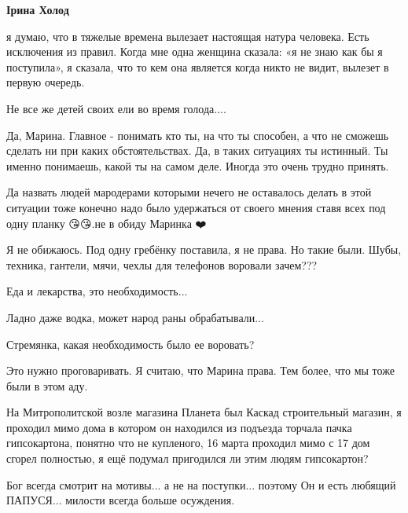 \textbf{Ірина Холод} 

я думаю, что в тяжелые времена вылезает настоящая натура человека. Есть
исключения из правил. Когда мне одна женщина сказала: «я не знаю как бы я
поступила», я сказала, что то кем она является когда никто не видит, вылезет в
первую очередь.

Не все же детей своих ели во время голода....

\begin{itemize} %

Да, Марина. Главное - понимать кто ты, на что ты способен, а что не сможешь
сделать ни при каких обстоятельствах. Да, в таких ситуациях ты истинный. Ты
именно понимаешь, какой ты на самом деле. Иногда это очень трудно принять.

\end{itemize} %


Да назвать людей мародерами которыми нечего не оставалось делать в этой
ситуации тоже конечно надо было удержаться от своего мнения ставя всех под одну
планку 😘😘.не в обиду Маринка ❤️


Я не обижаюсь. Под одну гребёнку поставила, я не права. Но такие были. Шубы,
техника, гантели, мячи, чехлы для телефонов воровали зачем???

Еда и лекарства, это необходимость...

Ладно даже водка, может народ раны обрабатывали...

Стремянка, какая необходимость было ее воровать?

\begin{itemize} %

Это нужно проговаривать. Я считаю, что Марина права. Тем более, что мы тоже
были в этом аду.

\end{itemize} %


На Митрополитской возле магазина Планета был Каскад строительный магазин, я
проходил мимо дома в котором он находился из подъезда торчала пачка
гипсокартона, понятно что не купленого, 16 марта проходил мимо с 17 дом сгорел
полностью, я ещё подумал пригодился ли этим людям гипсокартон?


Бог всегда смотрит на мотивы... а не на поступки... поэтому Он и есть любящий
ПАПУСЯ... милости всегда больше осуждения.

